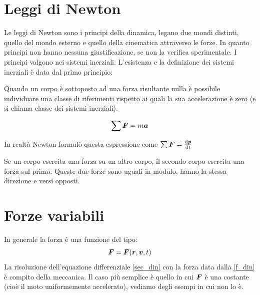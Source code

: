 \section{Leggi di Newton}
Le leggi di Newton sono i principi della dinamica, legano due mondi distinti, quello del mondo esterno e quello della cinematica attraverso le forze. In quanto principi non hanno nessuna giustificazione, se non la verifica sperimentale. I principi valgono nei sistemi inerziali. L'esistenza e la definizione dei sistemi inerziali è data dal primo principio:
\begin{Pri}
  Quando un corpo è sottoposto ad una forza risultante nulla è
  possibile individuare una classe di riferimenti rispetto ai quali
  la sua accelerazione è zero (e si chiama classe dei sistemi inerziali).
\end{Pri}
\begin{Pri}
  \begin{equation}
    \sum\boldsymbol{F}=m\boldsymbol{a}
    \label{sec_din}
  \end{equation}
\end{Pri}
In realtà Newton formulò questa espressione come $\sum \boldsymbol{F}=\frac{\mathrm{d} \boldsymbol{p}}{\mathrm{d} t}$
\begin{Pri}
  Se un corpo esercita una forza su un altro corpo, il secondo corpo
  esercita una forza sul primo. Queste due forze sono uguali in
  modulo, hanno la stessa direzione e versi opposti.
\end{Pri}


\section{Forze variabili}
In generale la forza è una funzione del tipo:
\begin{equation}
  \boldsymbol{F}=\boldsymbol{F}(\boldsymbol{r},\boldsymbol{v},t)
  \label{f_din}
\end{equation}
La risoluzione dell'equazione differenziale \eqref{sec_din} con la forza data dalla \eqref{f_din} è compito della meccanica. Il caso più semplice è quello in cui $\boldsymbol{F}$ è una costante (cioè il moto uniformemente accelerato), vediamo degli esempi in cui non lo è.

